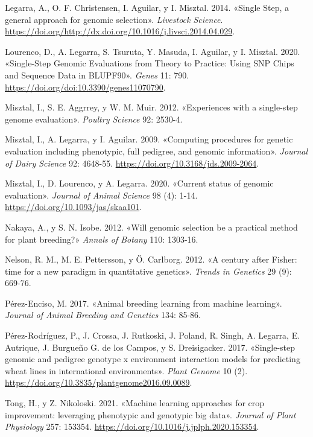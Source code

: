 \documentclass[11pt,spanish,a4paper,oneside,]{book} %
\begin{document}
\leavevmode\hypertarget{ref-cite:15}{}%
Legarra, A., O. F. Christensen, I. Aguilar, y I. Misztal. 2014. «Single Step, a general approach for genomic selection». \emph{Livestock Science}. \url{https://doi.org/http://dx.doi.org/10.1016/j.livsci.2014.04.029}.

\leavevmode\hypertarget{ref-cite:22}{}%
Lourenco, D., A. Legarra, S. Tsuruta, Y. Masuda, I. Aguilar, y I. Misztal. 2020. «Single-Step Genomic Evaluations from Theory to Practice: Using SNP Chips and Sequence Data in BLUPF90». \emph{Genes} 11: 790. \url{https://doi.org/doi:10.3390/genes11070790}.

\leavevmode\hypertarget{ref-cite:14}{}%
Misztal, I., S. E. Aggrrey, y W. M. Muir. 2012. «Experiences with a single-step genome evaluation». \emph{Poultry Science} 92: 2530-4.

\leavevmode\hypertarget{ref-cite:16}{}%
Misztal, I., A. Legarra, y I. Aguilar. 2009. «Computing procedures for genetic evaluation including phenotypic, full pedigree, and genomic information». \emph{Journal of Dairy Science} 92: 4648-55. \url{https://doi.org/10.3168/jds.2009-2064}.

\leavevmode\hypertarget{ref-cite:18}{}%
Misztal, I., D. Lourenco, y A. Legarra. 2020. «Current status of genomic evaluation». \emph{Journal of Animal Science} 98 (4): 1-14. \url{https://doi.org/10.1093/jas/skaa101}.

\leavevmode\hypertarget{ref-cite:6}{}%
Nakaya, A., y S. N. Isobe. 2012. «Will genomic selection be a practical method for plant breeding?» \emph{Annals of Botany} 110: 1303-16.

\leavevmode\hypertarget{ref-cite:2}{}%
Nelson, R. M., M. E. Pettersson, y Ö. Carlborg. 2012. «A century after Fisher: time for a new paradigm in quantitative genetics». \emph{Trends in Genetics} 29 (9): 669-76.

\leavevmode\hypertarget{ref-cite:5}{}%
Pérez-Enciso, M. 2017. «Animal breeding learning from machine learning». \emph{Journal of Animal Breeding and Genetics} 134: 85-86.

\leavevmode\hypertarget{ref-cite:19}{}%
Pérez-Rodríguez, P., J. Crossa, J. Rutkoski, J. Poland, R. Singh, A. Legarra, E. Autrique, J. Burgueño G. de los Campos, y S. Dreisigacker. 2017. «Single-step genomic and pedigree genotype x environment interaction models for predicting wheat lines in international environments». \emph{Plant Genome} 10 (2). \url{https://doi.org/10.3835/plantgenome2016.09.0089}.

\leavevmode\hypertarget{ref-cite:7}{}%
Tong, H., y Z. Nikoloski. 2021. «Machine learning approaches for crop improvement: leveraging phenotypic and genotypic big data». \emph{Journal of Plant Physiology} 257: 153354. \url{https://doi.org/10.1016/j.jplph.2020.153354}.
\end{document}
